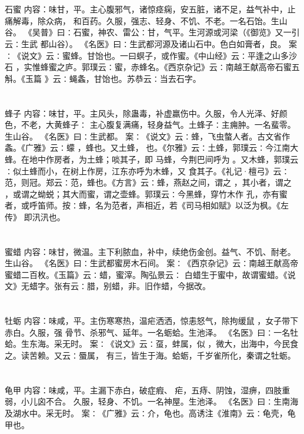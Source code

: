 \documentclass[12pt,UTF8]{ctexbook}
\begin{document}
\chapter{}石蜜
内容：味甘，平。主心腹邪气，诸惊痉痫，安五脏，诸不足，益气补中，止痛解毒，除众病， 
和百药。久服，强志、轻身、不饥、不老。一名石饴。生山谷。 
《吴普》曰∶石蜜，神农、雷公∶甘，气平。生河源或河梁（《御览》又一引云∶生武 
都山谷）。 
《名医》曰∶生武都河源及诸山石中。色白如膏者，良。 
案∶《说文》云∶蜜蜂。甘饴也。一曰螟子，或作蜜。《中山经》云∶平逢之山多沙石 
，实惟蜂蜜之庐。郭璞云∶蜜，赤蜂名。《西京杂记》云∶南越王献高帝石蜜五斛。《玉篇 
》云∶蝇螽，甘饴也。苏恭云∶当去石字。 


\chapter{}蜂子
内容：味甘，平。主风头，除蛊毒，补虚羸伤中。久服，令人光泽、好颜色，不老，大黄蜂子∶ 
主心腹复满痛，轻身益气。土蜂子∶主痈肿。一名蜚零。生山谷。 
《名医》曰∶生武都。 
案∶《说文》云∶蜂，飞虫螫人者。古文省作螽。《广雅》云∶蠓 ，蜂也。又土蜂， 
也。《尔雅》云∶土蜂，郭璞云∶今江南大蜂。在地中作房者，为土蜂；啖其子，即 
马蜂，今荆巴间呼为 。又木蜂，郭璞云∶似土蜂而小，在树上作房，江东亦呼为木蜂，又 
食其子。《礼记·檀弓》云∶范，则冠。郑云∶范，蜂也。《方言》云∶蜂，燕赵之间，谓之 
，其小者，谓之 ，或谓之蚴蜕；其大而蜜，谓之壶蜂。郭璞云∶今黑蜂，穿竹木作 
孔，亦有蜜者，或呼笛师。按∶蜂，名为范者，声相近，若《司马相如赋》以泛为枫。《左 
传》 即汛汛也。 


\chapter{}蜜蜡
内容：味甘，微温。主下利脓血，补中，续绝伤金创。益气、不饥、耐老。生山谷。 
《名医》曰∶生武都蜜房木石间。 
案∶《西京杂记》云∶南越王献高帝蜜蜡二百枚。《玉篇》云∶蜡，蜜滓。陶弘景云∶ 
白蜡生于蜜中，故谓蜜蜡。《说文》无蜡字。张有云∶腊，别蜡，非。旧作蜡，今据改。 


\chapter{}牡蛎
内容：味咸，平。主伤寒寒热，温疟洒洒，惊恚怒气，除拘缓鼠 ，女子带下赤白。久服，强 
骨节、杀邪气、延年。一名蛎蛤。生池泽。 
《名医》曰∶一名牡蛤。生东海。采无时。 
案∶《说文》云∶虿，蚌属，似 ，微大，出海中，今民食之。读苦赖。又云∶蜃属， 
有三，皆生于海。蛤蛎，千岁雀所化，秦谓之牡蛎。 


\chapter{}龟甲
内容：味咸，平。主漏下赤白，破症瘕、 疟，五痔、阴蚀，湿痹，四肢重弱，小儿囟不合。 
久服，轻身、不饥。一名神屋。生池泽。 
《名医》曰∶生南海及湖水中。采无时。 
案∶《广雅》云∶介，龟也。高诱注《淮南》云∶龟壳，龟甲也。 
\end{document}
